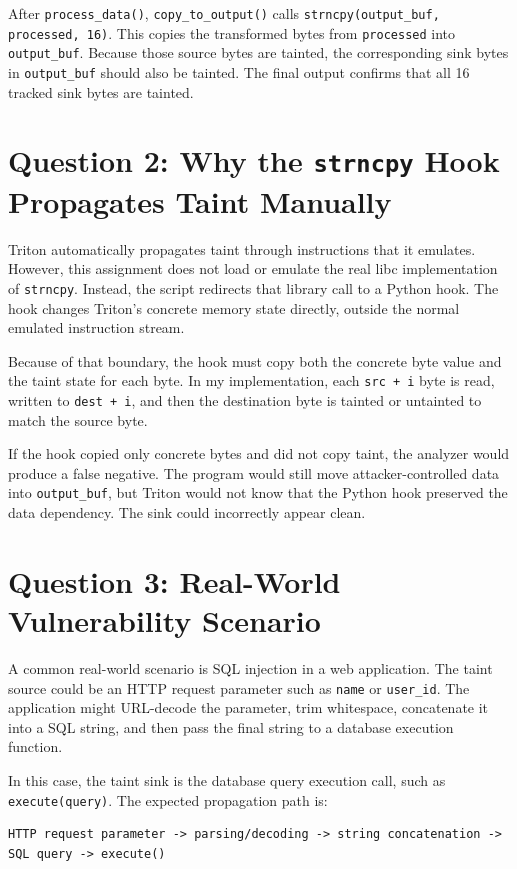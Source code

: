 \documentclass[11pt]{article}
\begin{document}
After \texttt{process\_data()}, \texttt{copy\_to\_output()} calls
\texttt{strncpy(output\_buf, processed, 16)}. This copies the transformed bytes
from \texttt{processed} into \texttt{output\_buf}. Because those source bytes are
tainted, the corresponding sink bytes in \texttt{output\_buf} should also be
tainted. The final output confirms that all 16 tracked sink bytes are tainted.

\section*{Question 2: Why the \texttt{strncpy} Hook Propagates Taint Manually}

Triton automatically propagates taint through instructions that it emulates.
However, this assignment does not load or emulate the real libc implementation
of \texttt{strncpy}. Instead, the script redirects that library call to a Python
hook. The hook changes Triton's concrete memory state directly, outside the
normal emulated instruction stream.

Because of that boundary, the hook must copy both the concrete byte value and
the taint state for each byte. In my implementation, each \texttt{src + i} byte
is read, written to \texttt{dest + i}, and then the destination byte is tainted
or untainted to match the source byte.

If the hook copied only concrete bytes and did not copy taint, the analyzer
would produce a false negative. The program would still move attacker-controlled
data into \texttt{output\_buf}, but Triton would not know that the Python hook
preserved the data dependency. The sink could incorrectly appear clean.

\section*{Question 3: Real-World Vulnerability Scenario}

A common real-world scenario is SQL injection in a web application. The taint
source could be an HTTP request parameter such as \texttt{name} or
\texttt{user\_id}. The application might URL-decode the parameter, trim
whitespace, concatenate it into a SQL string, and then pass the final string to
a database execution function.

In this case, the taint sink is the database query execution call, such as
\texttt{execute(query)}. The expected propagation path is:

\begin{lstlisting}
HTTP request parameter -> parsing/decoding -> string concatenation -> SQL query -> execute()
\end{lstlisting}
\end{document}
